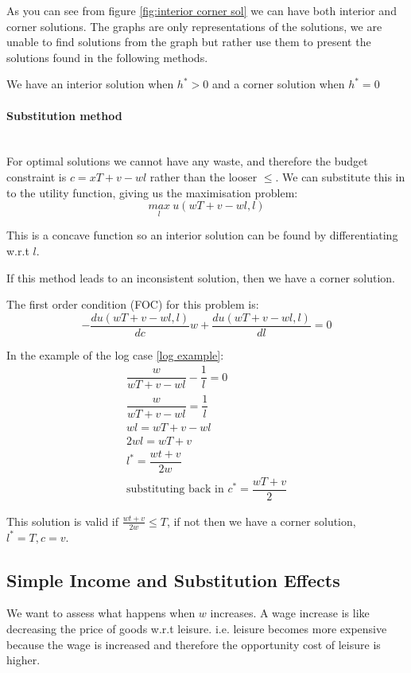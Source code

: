 \documentclass[11pt]{article}
\begin{document}
As you can see from figure \ref{fig:interior corner sol} we can have both interior and corner solutions. The graphs are only representations of the solutions, we are unable to find solutions from the graph but rather use them to present the solutions found in the following methods.

We have an interior solution when $h^*>0$ and a corner solution when $h^*=0$

\paragraph{Substitution method} \mbox{} \\

For optimal solutions we cannot have any waste, and therefore the budget constraint is $c=xT+v-wl$ rather than the looser $\leq$. We can substitute this in to the utility function, giving us the maximisation problem:
\[\underset{l}{max}\ u(wT + v - wl, l)\]

This is a concave function so an interior solution can be found by differentiating w.r.t $l$. 
\begin{note}
    If this method leads to an inconsistent solution, then we have a corner solution.
\end{note}

The first order condition (FOC) for this problem is:
\[-\dfrac{du(wT+v-wl, l)}{dc}w + \dfrac{du(wT+v-wl,l)}{dl} = 0\]

In the example of the log case \eqref{log example}:
\begin{gather*}
    \dfrac{w}{wT+v-wl}-\dfrac{1}{l} = 0 \\
    \dfrac{w}{wT+v-wl} = \dfrac{1}{l} \\
    wl = wT+v-wl \\
    2wl = wT+v \\
    l^* = \dfrac{wt+v}{2w} \\
    \text{substituting back in } c^* = \dfrac{wT + v}{2}
\end{gather*}

This solution is valid if $\frac{wt+v}{2w}\leq T$, if not then we have a corner solution, $l^* = T, c = v.$

\subsection{Simple Income and Substitution Effects}

We want to assess what happens when $w$ increases. A wage increase is like decreasing the price of goods w.r.t leisure. i.e. leisure becomes more expensive because the wage is increased and therefore the opportunity cost of leisure is higher.
\end{document}
